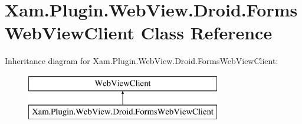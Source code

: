 \hypertarget{class_xam_1_1_plugin_1_1_web_view_1_1_droid_1_1_forms_web_view_client}{}\section{Xam.\+Plugin.\+Web\+View.\+Droid.\+Forms\+Web\+View\+Client Class Reference}
\label{class_xam_1_1_plugin_1_1_web_view_1_1_droid_1_1_forms_web_view_client}
Inheritance diagram for Xam.\+Plugin.\+Web\+View.\+Droid.\+Forms\+Web\+View\+Client\+:\begin{figure}[H]
\begin{center}
\leavevmode
\includegraphics[height=2.000000cm]{class_xam_1_1_plugin_1_1_web_view_1_1_droid_1_1_forms_web_view_client}
\end{center}
\end{figure}
